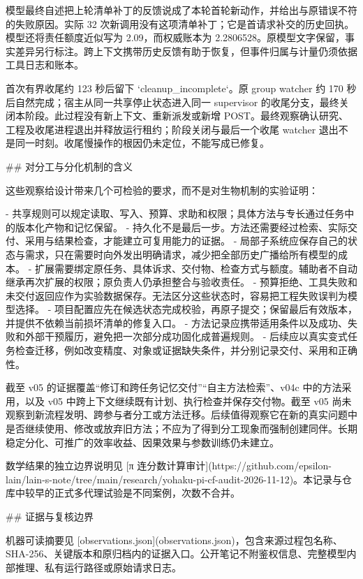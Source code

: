 模型最终自述把上轮清单补丁的反馈说成了本轮首轮新动作，并给出与原错误不符的失败原因。实际 32 次新调用没有这项清单补丁；它是首请求补交的历史回执。模型还将责任额度近似写为 2.09，而权威账本为 2.2806528。原模型文字保留，事实差异另行标注。跨上下文携带历史反馈有助于恢复，但事件归属与计量仍须依据工具日志和账本。

首次有界收尾约 123 秒后留下 `cleanup_incomplete`。原 group watcher 约 170 秒后自然完成；宿主从同一共享停止状态进入同一 supervisor 的收尾分支，最终关闭本阶段。此过程没有新上下文、重新派发或新增 POST。最终观察确认研究、工程及收尾进程退出并释放运行租约；阶段关闭与最后一个收尾 watcher 退出不是同一时刻。收尾慢操作的根因仍未定位，不能写成已修复。

## 对分工与分化机制的含义

这些观察给设计带来几个可检验的要求，而不是对生物机制的实验证明：

- 共享规则可以规定读取、写入、预算、求助和权限；具体方法与专长通过任务中的版本化产物和记忆保留。
- 持久化不是最后一步。方法还需要经过检索、实际交付、采用与结果检查，才能建立可复用能力的证据。
- 局部子系统应保存自己的状态与需求，只在需要时向外发出明确请求，减少把全部历史广播给所有模型的成本。
- 扩展需要绑定原任务、具体诉求、交付物、检查方式与额度。辅助者不自动继承再次扩展的权限；原负责人仍承担整合与验收责任。
- 预算拒绝、工具失败和未交付返回应作为实验数据保存。无法区分这些状态时，容易把工程失败误判为模型选择。
- 项目配置应先在候选状态完成校验，再原子提交；保留最后有效版本，并提供不依赖当前损坏清单的修复入口。
- 方法记录应携带适用条件以及成功、失败和外部干预履历，避免把一次部分成功固化成普遍规则。
- 后续应以真实变式任务检查迁移，例如改变精度、对象或证据缺失条件，并分别记录交付、采用和正确性。

截至 v05 的证据覆盖“修订和跨任务记忆交付”“自主方法检索”、v04c 中的方法采用，以及 v05 中跨上下文继续既有计划、执行检查并保存交付物。截至 v05 尚未观察到新流程发明、跨参与者分工或方法迁移。后续值得观察它在新的真实问题中是否继续使用、修改或放弃旧方法；不应为了得到分工现象而强制创建同伴。长期稳定分化、可推广的效率收益、因果效果与参数训练仍未建立。

数学结果的独立边界说明见 [π 连分数计算审计](https://github.com/epsilon-lain/lain-s-note/tree/main/research/yohaku-pi-cf-audit-2026-11-12)。本记录与仓库中较早的正式多代理试验是不同案例，次数不合并。

## 证据与复核边界

机器可读摘要见 [observations.json](observations.json)，包含来源过程包名称、SHA-256、关键版本和原归档内的证据入口。公开笔记不附鉴权信息、完整模型内部推理、私有运行路径或原始请求日志。

